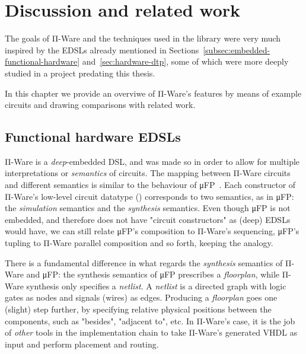 \chapter{Discussion and related work}
\label{chap:discussion-related-work}

    The goals of Π-Ware and the techniques used in the library were very much inspired by the
    \acp{EDSL} already mentioned in Sections~\ref{subsec:embedded-functional-hardware}
    and~\ref{sec:hardware-dtp}, some of which were more deeply studied in a project
    predating this thesis.

    In this chapter we provide an overviwe of Π-Ware's features by means of example circuits and
    drawing comparisons with related work.

    \section{Functional hardware \acp{EDSL}}
    \label{sec:discussion-functional}
        Π-Ware is a \emph{deep}-embedded \ac{DSL}, and was made so in order to allow for multiple
        interpretations or \emph{semantics} of circuits.
        The mapping between Π-Ware circuits and different semantics is similar to the behaviour
        of μFP~\cite{mufp-1984}.
        Each constructor of Π-Ware's low-level circuit datatype () corresponds to two
        semantics, as in μFP: the \emph{simulation} semantics and the \emph{synthesis} semantics.
        Even though μFP is not embedded, and therefore does not have "circuit constructors" as
        (deep) \acp{EDSL} would have, we can still relate μFP's composition to Π-Ware's sequencing,
        μFP's tupling to Π-Ware parallel composition and so forth, keeping the analogy.

        There is a fundamental difference in what regards the \emph{synthesis} semantics of Π-Ware
        and μFP: the synthesis semantics of μFP prescribes a \emph{floorplan}, while Π-Ware synthesis
        only specifies a \emph{netlist}.
        A \emph{netlist} is a directed graph with logic gates as nodes and signals (wires) as edges.
        Producing a \emph{floorplan} goes one (slight) step further, by specifying relative
        physical positions between the components, such as "besides", "adjacent to", etc.
        In Π-Ware's case, it is the job of \emph{other} tools in the implementation chain to take
        Π-Ware's generated \ac{VHDL} as input and perform placement and routing.

